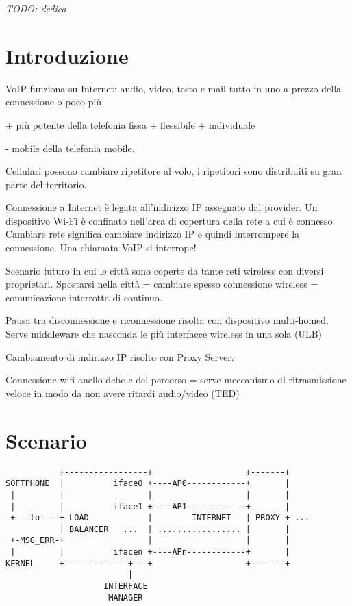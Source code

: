 \documentclass[12pt,a4paper,openright,twoside]{book}
\begin{document}
%
%
\begin{titlepage}
	\thispagestyle{empty}
	\topmargin=6.5cm
	\raggedleft
	\large
	\em
	TODO: dedica
\end{titlepage}


\chapter*{Introduzione}

	VoIP funziona su Internet: audio, video, testo e mail tutto in uno a prezzo
	della connessione o poco più.

	+ più potente della telefonia fissa
	+ flessibile
	+ individuale

	- mobile della telefonia mobile.

	Cellulari possono cambiare ripetitore al volo, i ripetitori sono distribuiti
	su gran parte del territorio.

	Connessione a Internet è legata all'indirizzo IP assegnato dal provider.
	Un dispositivo Wi-Fi è confinato nell'area di copertura della rete a cui è
	connesso. Cambiare rete significa cambiare indirizzo IP e quindi
	interrompere la connessione. Una chiamata VoIP si interrope!

	Scenario futuro in cui le città sono coperte da tante reti wireless con
	diversi proprietari. Spostarsi nella città = cambiare spesso connessione
	wireless = comunicazione interrotta di continuo.

	Pausa tra disconnessione e riconnessione risolta con dispositivo
	multi-homed. Serve middleware che nasconda le più interfacce wireless in una
	sola (ULB)

	Cambiamento di indirizzo IP risolto con Proxy Server.

	Connessione wifi anello debole del percorso = serve meccanismo di
	ritrasmissione veloce in modo da non avere ritardi audio/video (TED)

\tableofcontents

\chapter{Scenario}

	\begin{verbatim}
           +-----------------+                   +-------+
SOFTPHONE  |          iface0 +----AP0------------+       |
 |         |                 |                   |       |
 |         |          iface1 +----AP1------------+       |
 +---lo----+ LOAD            |        INTERNET   | PROXY +-...
           | BALANCER   ...  | ................. |       |
 +-MSG_ERR-+                 |                   |       |
 |         |          ifacen +----APn------------+       |
KERNEL     +-------------+---+                   +-------+
                         |
                    INTERFACE
                     MANAGER
\end{verbatim}
\end{document}
